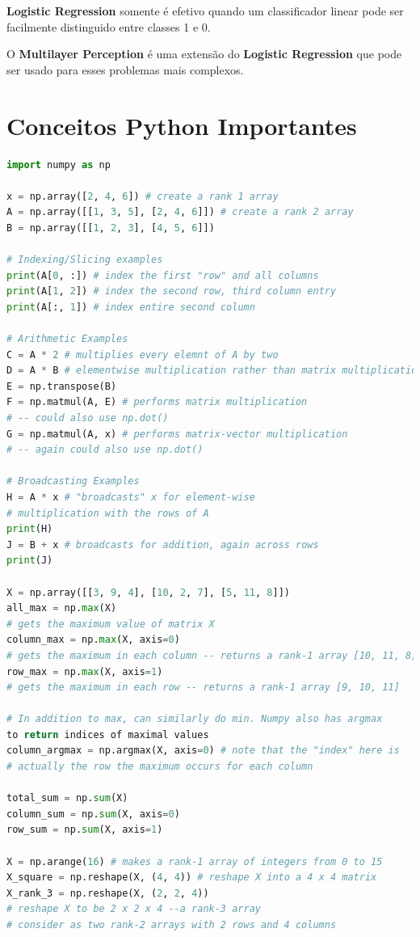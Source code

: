 \documentclass[11pt, a4paper]{article}
\begin{document}
\textbf{Logistic Regression} somente é efetivo quando um classificador linear pode ser facilmente distinguido entre classes 1 e 0.


O \textbf{Multilayer Perception} é uma extensão do \textbf{Logistic Regression} que pode ser usado para esses problemas mais complexos.

\pagebreak

\section{Conceitos Python Importantes}

\begin{lstlisting}[language=Python, caption=NumPy]
import numpy as np

x = np.array([2, 4, 6]) # create a rank 1 array
A = np.array([[1, 3, 5], [2, 4, 6]]) # create a rank 2 array
B = np.array([[1, 2, 3], [4, 5, 6]])

# Indexing/Slicing examples
print(A[0, :]) # index the first "row" and all columns
print(A[1, 2]) # index the second row, third column entry
print(A[:, 1]) # index entire second column

# Arithmetic Examples
C = A * 2 # multiplies every elemnt of A by two
D = A * B # elementwise multiplication rather than matrix multiplication
E = np.transpose(B)
F = np.matmul(A, E) # performs matrix multiplication 
# -- could also use np.dot()
G = np.matmul(A, x) # performs matrix-vector multiplication 
# -- again could also use np.dot()

# Broadcasting Examples
H = A * x # "broadcasts" x for element-wise 
# multiplication with the rows of A
print(H)
J = B + x # broadcasts for addition, again across rows
print(J)

X = np.array([[3, 9, 4], [10, 2, 7], [5, 11, 8]])
all_max = np.max(X) 
# gets the maximum value of matrix X
column_max = np.max(X, axis=0) 
# gets the maximum in each column -- returns a rank-1 array [10, 11, 8]
row_max = np.max(X, axis=1) 
# gets the maximum in each row -- returns a rank-1 array [9, 10, 11]

# In addition to max, can similarly do min. Numpy also has argmax 
to return indices of maximal values
column_argmax = np.argmax(X, axis=0) # note that the "index" here is 
# actually the row the maximum occurs for each column

total_sum = np.sum(X)
column_sum = np.sum(X, axis=0)
row_sum = np.sum(X, axis=1)

X = np.arange(16) # makes a rank-1 array of integers from 0 to 15
X_square = np.reshape(X, (4, 4)) # reshape X into a 4 x 4 matrix
X_rank_3 = np.reshape(X, (2, 2, 4)) 
# reshape X to be 2 x 2 x 4 --a rank-3 array
# consider as two rank-2 arrays with 2 rows and 4 columns

\end{lstlisting}
\end{document}
